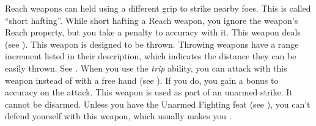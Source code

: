         Reach weapons can held using a different grip to strike nearby foes. This is called ``short hafting''. While short hafting a Reach weapon, you ignore the weapon's Reach property, but you take a  penalty to accuracy with it.
         This weapon deals  (see ).
         This weapon is designed to be thrown. Throwing weapons have a range increment listed in their description, which indicates the distance they can be easily thrown. See .
         When you use the \textit{trip} ability, you can attack with this weapon instead of with a free hand (see ).
        If you do, you gain a  bonus to accuracy on the attack.
         This weapon is used as part of an unarmed strike. It cannot be disarmed. Unless you have the Unarmed Fighting feat (see ), you can't defend yourself with this weapon, which usually makes you .

